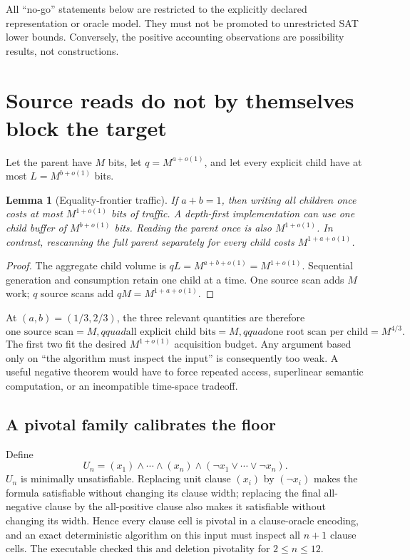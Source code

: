 \documentclass[11pt]{article}
\newtheorem{lemma}[theorem]{Lemma}
\begin{document}
All ``no-go'' statements below are restricted to the explicitly declared
representation or oracle model.  They must not be promoted to unrestricted
SAT lower bounds.  Conversely, the positive accounting observations are
possibility results, not constructions.

\section{Source reads do not by themselves block the target}

Let the parent have $M$ bits, let $q=M^{a+o(1)}$, and let every explicit child
have at most $L=M^{b+o(1)}$ bits.

\begin{lemma}[Equality-frontier traffic]
If $a+b=1$, then writing all children once costs at most $M^{1+o(1)}$ bits of
traffic.  A depth-first implementation can use one child buffer of
$M^{b+o(1)}$ bits.  Reading the parent once is also $M^{1+o(1)}$.  In
contrast, rescanning the full parent separately for every child costs
$M^{1+a+o(1)}$.
\end{lemma}

\begin{proof}
The aggregate child volume is $qL=M^{a+b+o(1)}=M^{1+o(1)}$.  Sequential
generation and consumption retain one child at a time.  One source scan adds
$M$ work; $q$ source scans add $qM=M^{1+a+o(1)}$.
\end{proof}

At $(a,b)=(1/3,2/3)$, the three relevant quantities are therefore
\[
 \text{one source scan}=M,qquad
 \text{all explicit child bits}=M,qquad
 \text{one root scan per child}=M^{4/3}.
\]
The first two fit the desired $M^{1+o(1)}$ acquisition budget.  Any argument
based only on ``the algorithm must inspect the input'' is consequently too
weak.  A useful negative theorem would have to force repeated access,
superlinear semantic computation, or an incompatible time-space tradeoff.

\subsection{A pivotal family calibrates the floor}

Define
\[
 U_n=(x_1)\wedge\cdots\wedge(x_n)\wedge
     (\neg x_1\vee\cdots\vee\neg x_n).
\]
$U_n$ is minimally unsatisfiable.  Replacing unit clause $(x_i)$ by
$(\neg x_i)$ makes the formula satisfiable without changing its clause width;
replacing the final all-negative clause by the all-positive clause also makes
it satisfiable without changing its width.  Hence every clause cell is
pivotal in a clause-oracle encoding, and an exact deterministic algorithm on
this input must inspect all $n+1$ clause cells.  The executable checked this
and deletion pivotality for $2\le n\le12$.
\end{document}
